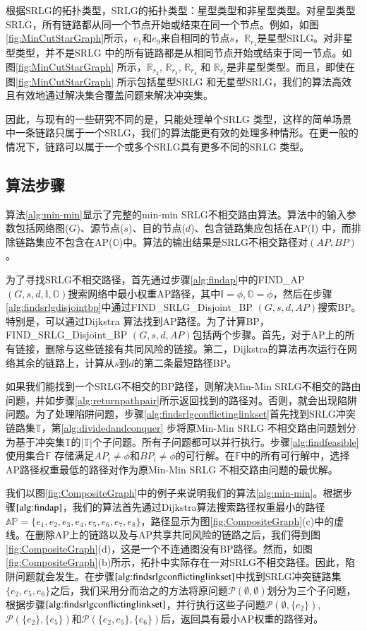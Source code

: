 根据SRLG的拓扑类型\cite{datta2008graph}，SRLG的拓扑类型：星型类型和非星型类型。对星型类型SRLG，所有链路都从同一个节点开始或结束在同一个节点。例如，如图\ref{fig:MinCutStarGraph}所示，$e_1$和$e_9$来自相同的节点$s$，$\mathbb{R}_{r_1}$是星型SRLG。对非星型类型，并不是SRLG 中的所有链路都是从相同节点开始或结束于同一节点。如图\ref{fig:MinCutStarGraph} 所示，$\mathbb{R}_{r_2}$, $\mathbb{R}_{r_3}$, $\mathbb{R}_{r_4}$ 和 $\mathbb{R}_{r_5}$是非星型类型。而且，即使在图\ref{fig:MinCutStarGraph} 所示包括星型SRLG 和无星型SRLG，我们的算法高效且有效地通过解决集合覆盖问题来解决冲突集。


因此，与现有的一些研究不同的是，\cite{datta2008graph}只能处理单个SRLG 类型，这样的简单场景中一条链路只属于一个SRLG，我们的算法能更有效的处理多种情形。在更一般的情况下，链路可以属于一个或多个SRLG具有更多不同的SRLG 类型。
\subsection{算法步骤}
算法\ref{alg:min-min}显示了完整的min-min SRLG不相交路由算法。算法中的输入参数包括网络图($G$)、源节点($s$)、目的节点($d$)、包含链路集应包括在AP($\mathbb{I}$) 中，而排除链路集应不包含在AP($\mathbb{O}$)中。算法的输出结果是SRLG不相交路径对$(AP,BP)$。

为了寻找SRLG不相交路径，首先通过步骤\ref{alg:findap}中的FIND\_AP$(G,s,d, \mathbb{I},\mathbb{O})$搜索网络中最小权重AP路径，其中$\mathbb{I}=\phi,\mathbb{O}=\phi$，然后在步骤\ref{alg:findsrlgdisjointbp}中通过FIND\_SRLG\_Disjoint\_BP
$(G,s,d,AP)$搜索BP。特别是，可以通过Dijkstra 算法找到AP路径。为了计算BP，FIND\_SRLG\_Disjoint\_BP
$(G,s,d,AP)$包括两个步骤。首先，对于AP上的所有链接，删除与这些链接有共同风险的链接。第二，Dijkstra的算法再次运行在网络其余的链路上，计算从$s$到$d$的第二条最短路径BP。

如果我们能找到一个SRLG不相交的BP路径，则解决Min-Min SRLG不相交的路由问题，并如步骤\ref{alg:returnpathpair}所示返回找到的路径对。否则，就会出现陷阱问题。为了处理陷阱问题，步骤\ref{alg:findsrlgconflictinglinkset}首先找到SRLG冲突链路集$\mathbb{T}$，第\ref{alg:dividedandconquer} 步将原Min-Min SRLG 不相交路由问题划分为基于冲突集$\mathbb{T}$的$\left| \mathbb{T} \right|$个子问题。所有子问题都可以并行执行。步骤\ref{alg:findfeasible} 使用集合$\mathbb{F}$ 存储满足$A{P_i} \ne \phi$和$B{P_i} \ne \phi$的可行解。在$\mathbb{F}$中的所有可行解中，选择AP路径权重最低的路径对作为原Min-Min SRLG 不相交路由问题的最优解。

我们以图\ref{fig:CompositeGraph}中的例子来说明我们的算法\ref{alg:min-min}。根据步骤$\ref{alg:findap}$，我们的算法首先通过Dijkstra算法搜索路径权重最小的路径$\mathbb{AP}=\{e_1,e_2,e_3,e_4,e_5,e_6,e_7,e_8\}$，路径显示为图\ref{fig:CompositeGraph}(c)中的虚线。在删除AP上的链路以及与AP共享共同风险的链路之后，我们得到图\ref{fig:CompositeGraph}(d)，这是一个不连通图没有BP路径。然而，如图\ref{fig:CompositeGraph}(b)所示，拓扑中实际存在一对SRLG不相交路径。因此，陷阱问题就会发生。在步骤$\ref{alg:findsrlgconflictinglinkset}$中找到SRLG冲突链路集$\{e_2,e_5,e_6\}$之后，我们采用分而治之的方法将原问题${\mathcal P}(\emptyset ,\emptyset )$划分为三个子问题，根据步骤$\ref{alg:findsrlgconflictinglinkset}$，并行执行这些子问题${\mathcal P}(\emptyset ,\{e_2\} )$, ${\mathcal P}(\{e_2\} ,\{e_5\} )$和${\mathcal P}(\{e_2,e_5\} ,\{e_6\} )$后，返回具有最小AP权重的路径对。


